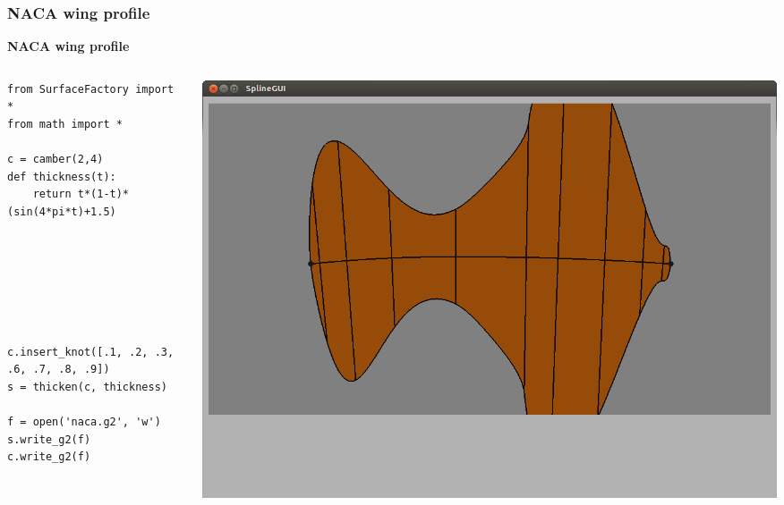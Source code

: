 \documentclass{beamer}
\theoremstyle{plain}
\theoremstyle{definition}
\begin{document}
\begin{frame}[fragile]
\frametitle{NACA wing profile}
\textbf{NACA wing profile}

\begin{columns}
    \begin{column}{.50\linewidth}
        \begin{listing}[H]
            \tiny
            \begin{verbatim}
from SurfaceFactory import *
from math import *

c = camber(2,4)
def thickness(t):
    return t*(1-t)*(sin(4*pi*t)+1.5)






    
c.insert_knot([.1, .2, .3, .6, .7, .8, .9])
s = thicken(c, thickness)

f = open('naca.g2', 'w')
s.write_g2(f)
c.write_g2(f)

            \end{verbatim}
        \end{listing}
    \end{column}
    \begin{column}{.45\linewidth}
        \includegraphics[width=\linewidth]{naca5}
    \end{column}
\end{columns}

\end{frame}

\end{document}
